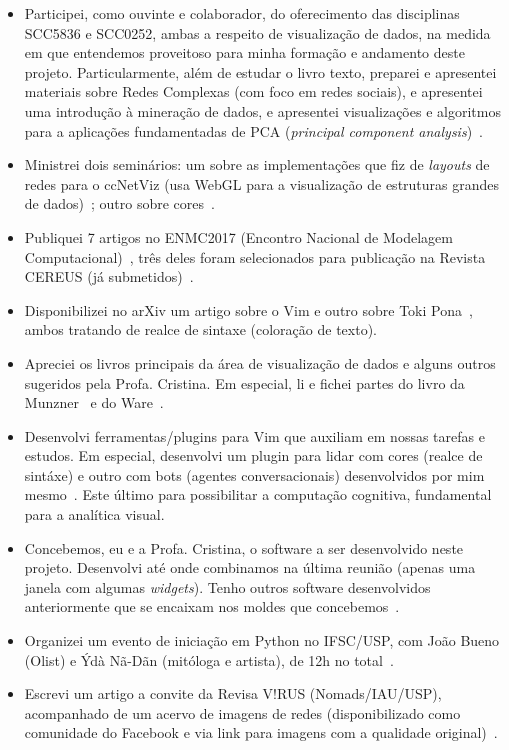 \documentclass[a4paper, 11pt]{article}
\begin{document}
\begin{itemize}
  \item Participei, como ouvinte e colaborador, do oferecimento das disciplinas SCC5836 e SCC0252, ambas a respeito de visualização de dados, na medida em que entendemos proveitoso para minha formação e andamento deste projeto.
    Particularmente, além de estudar o livro texto, preparei e apresentei materiais sobre Redes Complexas (com foco em redes sociais), e apresentei uma introdução à mineração de dados, e apresentei visualizações e algoritmos para a aplicações fundamentadas de PCA (\emph{principal component analysis})~\cite{slidesDV}.
  \item Ministrei dois seminários: um sobre as implementações que fiz de \emph{layouts} de redes para o ccNetViz (usa WebGL para a visualização de estruturas grandes de dados)~\cite{sem1}; outro sobre cores~\cite{sem2}.
  \item Publiquei 7 artigos no ENMC2017 (Encontro Nacional de Modelagem Computacional)~\cite{e1,e2,e3,e4,e5,e6,e7}, três deles foram selecionados para publicação na Revista CEREUS (já submetidos)~\cite{e2,e3,e4}.
  \item Disponibilizei no arXiv um artigo sobre o Vim e outro sobre Toki Pona~\cite{arxiv}, ambos tratando de realce de sintaxe (coloração de texto).
  \item Apreciei os livros principais da área de visualização de dados e alguns outros sugeridos pela Profa. Cristina. Em especial, li e fichei partes do livro da Munzner~\cite{munzner} e do Ware~\cite{ware}.\cite{ward}
  \item Desenvolvi ferramentas/plugins para Vim que auxiliam em nossas tarefas e estudos. Em especial, desenvolvi um plugin para lidar com cores (realce de sintáxe) e outro com bots (agentes conversacionais) desenvolvidos por mim mesmo~\cite{prv}. Este último para possibilitar a computação cognitiva, fundamental para a analítica visual.
  \item Concebemos, eu e a Profa. Cristina, o software a ser desenvolvido neste projeto. Desenvolvi até onde combinamos na última reunião (apenas uma janela com algumas \emph{widgets}). Tenho outros software desenvolvidos anteriormente que se encaixam nos moldes que concebemos~\cite{repos}.
  \item Organizei um evento de iniciação em Python no IFSC/USP, com João Bueno (Olist) e Ýdà Nã-Dãn (mitóloga e artista), de 12h no total~\cite{bueno}.
  \item Escrevi um artigo a convite da Revisa V!RUS (Nomads/IAU/USP), acompanhado de um acervo de imagens de redes (disponibilizado como comunidade do Facebook e via link para imagens com a qualidade original)~\cite{virus}.

\end{itemize}
\end{document}
